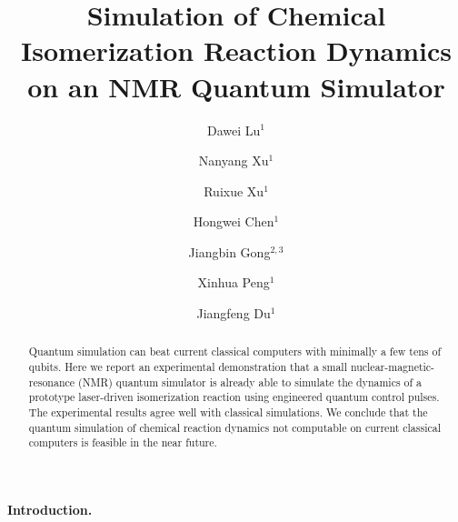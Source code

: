 \documentclass[prl,twocolumn,showpacs]{revtex4}
\begin{document}
\title{Simulation of Chemical Isomerization Reaction Dynamics on an NMR Quantum Simulator}
\author{Dawei Lu$^{1}$}
\author{Nanyang Xu$^{1}$}
\author{Ruixue Xu$^{1}$}
\author{Hongwei Chen$^{1}$}
\author{Jiangbin Gong$^{2,3}$}
\author{Xinhua Peng$^{1}$}
\author{Jiangfeng Du$^{1}$}




\begin{abstract}


Quantum simulation can beat current classical computers with minimally a few tens of qubits. %
Here we report an experimental demonstration that a small
nuclear-magnetic-resonance (NMR) quantum simulator is already able to
simulate the dynamics of a prototype laser-driven isomerization reaction using engineered quantum control pulses.
The experimental results agree well with classical simulations.
We conclude that the quantum simulation of chemical reaction dynamics not computable on current classical computers is feasible in the near future.


\end{abstract}

\maketitle



\paragraph*{Introduction.}
\end{document}
